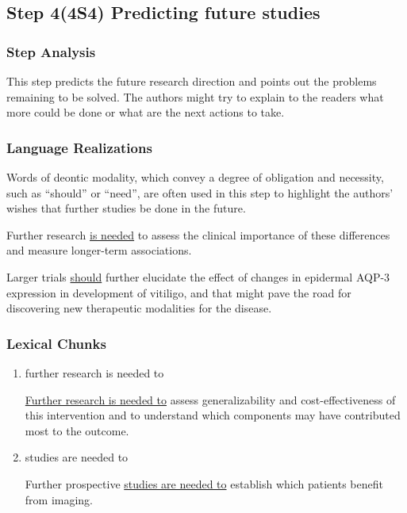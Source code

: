 \documentclass[a4paper]{ctexbook}
\begin{document}
  \subsection{Step 4(4S4) Predicting future studies}
    \subsubsection{Step Analysis}

    This step predicts the future research direction and points out the problems remaining to be solved. The authors might try to explain to the readers what more could be done or what are the next actions to take.

    \subsubsection{Language Realizations}

    Words of deontic modality, which convey a degree of obligation and necessity, such as ``should'' or ``need'', are often used in this step to highlight the authors' wishes that further studies be done in the future.

    \begin{eg}{}
      Further research \uline{is needed} to assess the clinical importance of these differences and measure longer-term associations.  
    \end{eg}

    \begin{eg}{}
      Larger trials \uline{should} further elucidate the effect of changes in epidermal AQP-3 expression in development of vitiligo, and that might pave the road for discovering new therapeutic modalities for the disease. 
    \end{eg}

    \subsubsection{Lexical Chunks}

    \begin{enumerate}
      \item further research is needed to
      \begin{eg}{}
        \uline{Further research is needed to} assess generalizability and cost-effectiveness of this intervention and to understand which components may have contributed most to the outcome. 
      \end{eg}

      \item studies are needed to
      \begin{eg}{}
        Further prospective \uline{studies are needed to} establish which patients benefit from imaging.  
      \end{eg}

    \end{enumerate}
\end{document}
